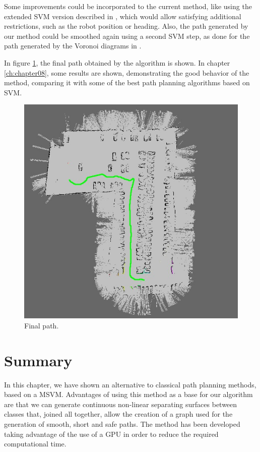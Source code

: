 Some improvements could be incorporated to the current method, like using the extended \ac{SVM} version described in \cite{qingyang2012local}, which would allow satisfying additional restrictions, such as the robot position or heading. Also, the path generated by our method could be smoothed again using a second \ac{SVM} step, as done for the path generated by the Voronoi diagrams in \cite{yang2012safe}.

In figure \ref{fig:cp06_final_path}, the final path obtained by the algorithm is shown. In chapter \ref{ch:chapter08}, some results are shown, demonstrating the good behavior of the method, comparing it with some of the best path planning algorithms based on \ac{SVM}.

\begin{figure}[h!]
  \centering
  \includegraphics[width=\textwidth, height=0.75\textwidth]{figure7}
  \caption{Final path.}
  \label{fig:cp06_final_path}
\end{figure}

\section{Summary}\label{ch:chapter06_03}

In this chapter, we have shown an alternative to classical path planning methods, based on a \acf{MSVM}. Advantages of using this method as a base for our algorithm are that we can generate continuous non-linear separating surfaces between classes that, joined all together, allow the creation of a graph used for the generation of smooth, short and safe paths. The method has been developed taking advantage of the use of a \ac{GPU} in order to reduce the required computational time. 

